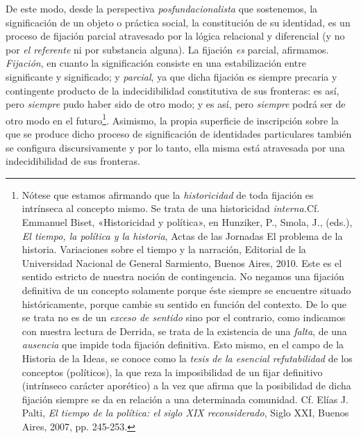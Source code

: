 De este modo, desde la perspectiva \emph{posfundacionalista} que sostenemos, la significación de un objeto o práctica social, la constitución de su identidad, es un proceso de fijación parcial atravesado por la lógica relacional y diferencial (y no por \emph{el referente} ni por substancia alguna). La fijación \emph{es} parcial, afirmamos. \emph{Fijación}, en cuanto la significación consiste en una estabilización entre significante y significado; y \emph{parcial}, ya que dicha fijación es siempre precaria y contingente producto de la indecidibilidad constitutiva de sus fronteras: es así, pero \emph{siempre} pudo haber sido de otro modo; y es así, pero \emph{siempre} podrá ser de otro modo en el futuro\footnote{Nótese que estamos afirmando que la \emph{historicidad} de toda fijación es intrínseca al concepto mismo. Se trata de una historicidad \emph{interna.}Cf. Emmanuel Biset, «Historicidad y política», en Hunziker, P., Smola, J., (eds.), \emph{El tiempo, la política y la historia}, Actas de las Jornadas El problema de la historia. Variaciones sobre el tiempo y la narración, Editorial de la Universidad Nacional de General Sarmiento, Buenos Aires, 2010. Este es el sentido estricto de nuestra noción de contingencia. No negamos una fijación definitiva de un concepto solamente porque éste siempre se encuentre situado históricamente, porque cambie su sentido en función del contexto. De lo que se trata no es de un \emph{exceso de sentido} sino por el contrario, como indicamos con nuestra lectura de Derrida, se trata de la existencia de una \emph{falta}, de una \emph{ausencia} que impide toda fijación definitiva. Esto mismo, en el campo de la Historia de la Ideas, se conoce como la \emph{tesis de la esencial refutabilidad} de los conceptos (políticos), la que reza la imposibilidad de un fijar definitivo (intrínseco carácter aporético) a la vez que afirma que la posibilidad de dicha fijación siempre se da en relación a una determinada comunidad. Cf. Elías J. Palti, \emph{El tiempo de la política: el siglo XIX reconsiderado}, Siglo XXI, Buenos Aires, 2007, pp. 245-253.}. Asimismo, la propia superficie de inscripción sobre la que se produce dicho proceso de significación de identidades particulares también se configura discursivamente y por lo tanto, ella misma está atravesada por una indecidibilidad de sus fronteras.

